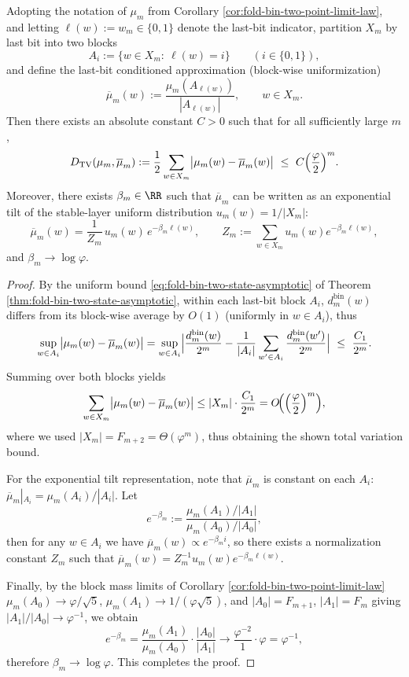 \begin{proposition}\label{prop:fold-bin-lastbit-sufficient-tv}
Adopting the notation of \(\mu_m\) from Corollary \ref{cor:fold-bin-two-point-limit-law}, and letting \(\ell(w):=w_m\in\{0,1\}\) denote the last-bit indicator,
partition \(X_m\) by last bit into two blocks
\[
A_i:=\{w\in X_m:\ \ell(w)=i\}\qquad(i\in\{0,1\}),
\]
and define the last-bit conditioned approximation (block-wise uniformization)
\[
\overline\mu_m(w):=\frac{\mu_m(A_{\ell(w)})}{|A_{\ell(w)}|},\qquad w\in X_m.
\]
Then there exists an absolute constant \(C>0\) such that for all sufficiently large \(m\),
\[
D_{\mathrm{TV}}(\mu_m,\overline\mu_m)
:=\frac12\sum_{w\in X_m}\bigl|\mu_m(w)-\overline\mu_m(w)\bigr|
\ \le\ C\Bigl(\frac{\varphi}{2}\Bigr)^m.
\]
Moreover, there exists \(\beta_m\in\RR\) such that \(\overline\mu_m\) can be written as an exponential tilt of the stable-layer uniform distribution \(u_m(w)=1/|X_m|\):
\[
\overline\mu_m(w)=\frac{1}{Z_m}\,u_m(w)\,e^{-\beta_m\ell(w)},
\qquad
Z_m:=\sum_{w\in X_m}u_m(w)e^{-\beta_m\ell(w)},
\]
and \(\beta_m\to\log\varphi\).
\end{proposition}
\begin{proof}
By the uniform bound \eqref{eq:fold-bin-two-state-asymptotic} of Theorem \ref{thm:fold-bin-two-state-asymptotic}, within each last-bit block \(A_i\),
\(
d^{\mathrm{bin}}_m(w)
\)
differs from its block-wise average by \(O(1)\) (uniformly in \(w\in A_i\)), thus
\[
\sup_{w\in A_i}\bigl|\mu_m(w)-\overline\mu_m(w)\bigr|
=\sup_{w\in A_i}\Bigl|\frac{d^{\mathrm{bin}}_m(w)}{2^m}-\frac{1}{|A_i|}\sum_{w'\in A_i}\frac{d^{\mathrm{bin}}_m(w')}{2^m}\Bigr|
\ \le\ \frac{C_1}{2^m}.
\]
Summing over both blocks yields
\[
\sum_{w\in X_m}\bigl|\mu_m(w)-\overline\mu_m(w)\bigr|
\le
|X_m|\cdot \frac{C_1}{2^m}
=O\!\Bigl(\Bigl(\frac{\varphi}{2}\Bigr)^m\Bigr),
\]
where we used \(|X_m|=F_{m+2}=\Theta(\varphi^m)\), thus obtaining the shown total variation bound.
\par
For the exponential tilt representation, note that \(\overline\mu_m\) is constant on each \(A_i\): \(\overline\mu_m|_{A_i}=\mu_m(A_i)/|A_i|\).
Let
\[
e^{-\beta_m}:=\frac{\mu_m(A_1)/|A_1|}{\mu_m(A_0)/|A_0|},
\]
then for any \(w\in A_i\) we have \(\overline\mu_m(w)\propto e^{-\beta_m i}\), so there exists a normalization constant \(Z_m\) such that
\(
\overline\mu_m(w)=Z_m^{-1}u_m(w)e^{-\beta_m\ell(w)}
\).
\par
Finally, by the block mass limits of Corollary \ref{cor:fold-bin-two-point-limit-law}
\(\mu_m(A_0)\to \varphi/\sqrt5\), \(\mu_m(A_1)\to 1/(\varphi\sqrt5)\), and \(|A_0|=F_{m+1}\), \(|A_1|=F_m\) giving
\(|A_1|/|A_0|\to \varphi^{-1}\), we obtain
\[
e^{-\beta_m}
=\frac{\mu_m(A_1)}{\mu_m(A_0)}\cdot\frac{|A_0|}{|A_1|}
\longrightarrow
\frac{\varphi^{-2}}{1}\cdot \varphi
=\varphi^{-1},
\]
therefore \(\beta_m\to\log\varphi\). This completes the proof.
\end{proof}

